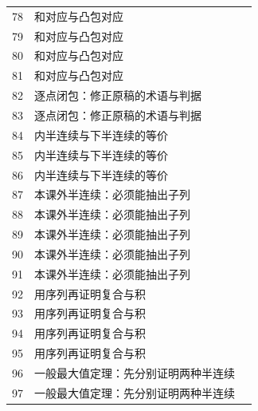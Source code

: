 \begin{longtable}{r p{.66\linewidth} r}
78 & 和对应与凸包对应 & \pageref{g:108:77}\\

79 & 和对应与凸包对应 & \pageref{g:108:77}\\

80 & 和对应与凸包对应 & \pageref{g:108:77}\\

81 & 和对应与凸包对应 & \pageref{g:108:77}\\

82 & 逐点闭包：修正原稿的术语与判据 & \pageref{g:108:82}\\

83 & 逐点闭包：修正原稿的术语与判据 & \pageref{g:108:82}\\

84 & 内半连续与下半连续的等价 & \pageref{g:108:84}\\

85 & 内半连续与下半连续的等价 & \pageref{g:108:84}\\

86 & 内半连续与下半连续的等价 & \pageref{g:108:84}\\

87 & 本课外半连续：必须能抽出子列 & \pageref{g:108:87}\\

88 & 本课外半连续：必须能抽出子列 & \pageref{g:108:87}\\

89 & 本课外半连续：必须能抽出子列 & \pageref{g:108:87}\\

90 & 本课外半连续：必须能抽出子列 & \pageref{g:108:87}\\

91 & 本课外半连续：必须能抽出子列 & \pageref{g:108:87}\\

92 & 用序列再证明复合与积 & \pageref{g:108:92}\\

93 & 用序列再证明复合与积 & \pageref{g:108:92}\\

94 & 用序列再证明复合与积 & \pageref{g:108:92}\\

95 & 用序列再证明复合与积 & \pageref{g:108:92}\\

96 & 一般最大值定理：先分别证明两种半连续 & \pageref{g:108:96}\\

97 & 一般最大值定理：先分别证明两种半连续 & \pageref{g:108:96}\\


\end{longtable}
